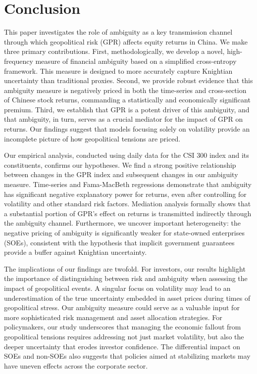 \documentclass[preprint,12pt,authoryear]{elsarticle}
\begin{document}
\section{Conclusion}
\label{sec:conclusion}

This paper investigates the role of ambiguity as a key transmission channel through which geopolitical risk (GPR) affects equity returns in China. We make three primary contributions. First, methodologically, we develop a novel, high-frequency measure of financial ambiguity based on a simplified cross-entropy framework. This measure is designed to more accurately capture Knightian uncertainty than traditional proxies. Second, we provide robust evidence that this ambiguity measure is negatively priced in both the time-series and cross-section of Chinese stock returns, commanding a statistically and economically significant premium. Third, we establish that GPR is a potent driver of this ambiguity, and that ambiguity, in turn, serves as a crucial mediator for the impact of GPR on returns. Our findings suggest that models focusing solely on volatility provide an incomplete picture of how geopolitical tensions are priced.

Our empirical analysis, conducted using daily data for the CSI 300 index and its constituents, confirms our hypotheses. We find a strong positive relationship between changes in the GPR index and subsequent changes in our ambiguity measure. Time-series and Fama-MacBeth regressions demonstrate that ambiguity has significant negative explanatory power for returns, even after controlling for volatility and other standard risk factors. Mediation analysis formally shows that a substantial portion of GPR's effect on returns is transmitted indirectly through the ambiguity channel. Furthermore, we uncover important heterogeneity: the negative pricing of ambiguity is significantly weaker for state-owned enterprises (SOEs), consistent with the hypothesis that implicit government guarantees provide a buffer against Knightian uncertainty.

The implications of our findings are twofold. For investors, our results highlight the importance of distinguishing between risk and ambiguity when assessing the impact of geopolitical events. A singular focus on volatility may lead to an underestimation of the true uncertainty embedded in asset prices during times of geopolitical stress. Our ambiguity measure could serve as a valuable input for more sophisticated risk management and asset allocation strategies. For policymakers, our study underscores that managing the economic fallout from geopolitical tensions requires addressing not just market volatility, but also the deeper uncertainty that erodes investor confidence. The differential impact on SOEs and non-SOEs also suggests that policies aimed at stabilizing markets may have uneven effects across the corporate sector.
\end{document}
